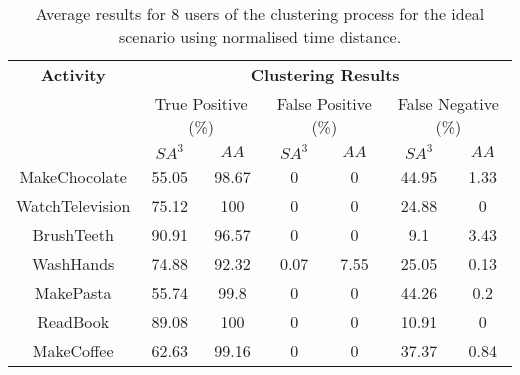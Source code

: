 \begin{table}[htbp]\scriptsize
  \begin{center}
        \begin{tabular}{ccccccc}
            \hline            
            \textbf{Activity} & \multicolumn{6}{c}{\textbf{Clustering Results}} \\
             & \multicolumn{2}{c}{True Positive (\%)} & \multicolumn{2}{c}{False Positive (\%)} & \multicolumn{2}{c}{False Negative (\%)} \\
             & $SA^3$ & $AA$ & $SA^3$ & $AA$ & $SA^3$ & $AA$ \\
            \hline
            MakeChocolate   & 55.05 & 98.67 & 0    & 0    & 44.95 & 1.33 \\
	    WatchTelevision & 75.12 & 100   & 0    & 0    & 24.88 & 0    \\
	    BrushTeeth      & 90.91 & 96.57 & 0    & 0    & 9.1   & 3.43 \\
	    WashHands       & 74.88 & 92.32 & 0.07 & 7.55 & 25.05 & 0.13 \\
	    MakePasta       & 55.74 & 99.8  & 0    & 0    & 44.26 & 0.2 \\
	    ReadBook        & 89.08 & 100   & 0    & 0    & 10.91 & 0 \\
	    MakeCoffee      & 62.63 & 99.16 & 0    & 0    & 37.37 & 0.84 \\
            \hline
        \end{tabular}
        \caption{Average results for 8 users of the clustering process for the ideal scenario using normalised time distance.}
        \label{tab-r-ideal-t2}
        \end{center}
\end{table}

